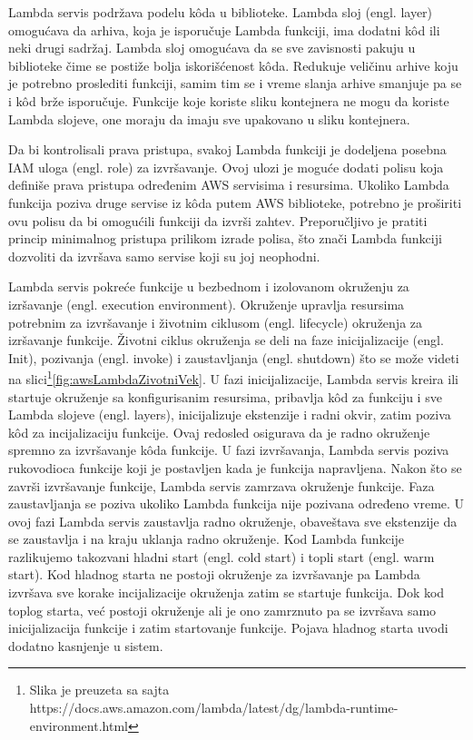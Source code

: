 \documentclass[12pt,oneside]{memoir}
\begin{document}
Lambda servis podržava podelu kôda u biblioteke. Lambda sloj (engl. layer) omogućava da arhiva, koja je isporučuje Lambda funkciji, ima dodatni kôd ili neki drugi sadržaj. Lambda sloj omogućava da se sve zavisnosti pakuju u biblioteke čime se postiže bolja iskorišćenost kôda. Redukuje veličinu arhive koju je potrebno proslediti funkciji, samim tim se i vreme slanja arhive smanjuje pa se i kôd brže isporučuje. Funkcije koje koriste sliku kontejnera ne mogu da koriste Lambda slojeve, one moraju da imaju sve upakovano u sliku kontejnera.

 
Da bi kontrolisali prava pristupa, svakoj Lambda funkciji je dodeljena posebna IAM uloga (engl. role) za izvršavanje. Ovoj ulozi je moguće dodati polisu koja definiše prava pristupa određenim AWS servisima i resursima. Ukoliko Lambda funkcija poziva druge servise iz kôda putem AWS biblioteke, potrebno je proširiti ovu polisu da bi omogućili funkciji da izvrši zahtev. Preporučljivo je pratiti princip minimalnog pristupa prilikom izrade polisa, što znači Lambda funkciji dozvoliti da izvršava samo servise koji su joj neophodni. 

 
Lambda servis pokreće funkcije u bezbednom i izolovanom okruženju za izršavanje (engl. execution environment). Okruženje upravlja resursima potrebnim za izvršavanje i životnim ciklusom (engl. lifecycle) okruženja za izršavanje funkcije. Životni ciklus okruženja se deli na faze inicijalizacije (engl. Init), pozivanja (engl. invoke) i zaustavljanja (engl. shutdown) što se može videti na slici\footnote{Slika je preuzeta sa sajta https://docs.aws.amazon.com/lambda/latest/dg/lambda-runtime-environment.html}\ref{fig:awsLambdaZivotniVek}. U fazi inicijalizacije, Lambda servis kreira ili startuje okruženje sa konfigurisanim resursima, pribavlja kôd za funkciju i sve Lambda slojeve (engl. layers), inicijalizuje ekstenzije i radni okvir, zatim poziva kôd za incijalizaciju funkcije. Ovaj redosled osigurava da je radno okruženje spremno za izvršavanje kôda funkcije. U fazi izvršavanja, Lambda servis poziva rukovodioca funkcije koji je postavljen kada je funkcija napravljena. Nakon što se završi izvršavanje funkcije, Lambda servis zamrzava okruženje funkcije. Faza zaustavljanja se poziva ukoliko Lambda funkcija nije pozivana određeno vreme. U ovoj fazi Lambda servis zaustavlja radno okruženje, obaveštava sve ekstenzije da se zaustavlja i na kraju uklanja radno okruženje. Kod Lambda funkcije razlikujemo takozvani hladni start (engl. cold start) i topli start (engl. warm start). Kod hladnog starta ne postoji okruženje za izvršavanje pa Lambda izvršava sve korake incijalizacije okruženja zatim se startuje funkcija. Dok kod toplog starta, već postoji okruženje ali je ono zamrznuto pa se izvršava samo inicijalizacija funkcije i zatim startovanje funkcije. Pojava hladnog starta uvodi dodatno kasnjenje u sistem. 
 
\end{document}
